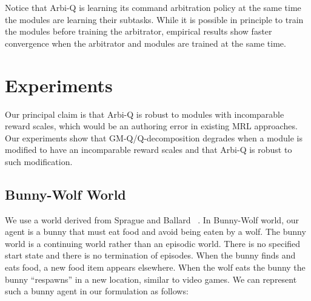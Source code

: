 Notice that Arbi-Q is learning its command arbitration policy at the same time the modules are learning their subtasks. While it is possible in principle to train the modules before training the arbitrator, empirical results show faster convergence when the arbitrator and modules are trained at the same time.

\section{Experiments}

Our principal claim is that Arbi-Q is robust to modules with incomparable reward scales, which would be an authoring error in existing MRL approaches. Our experiments show that GM-Q/Q-decomposition degrades when a module is modified to have an incomparable reward scales and that Arbi-Q is robust to such modification.

\subsection{Bunny-Wolf World}

We use a world derived from Sprague and Ballard ~\cite{sprague2003multiple-goal}.  In Bunny-Wolf world, our agent is a bunny that must eat food and avoid being eaten by a wolf.  The bunny world is a continuing world rather than an episodic world. There is no specified start state and there is no termination of episodes. When the bunny finds and eats food, a new food item appears elsewhere. When the wolf eats the bunny the bunny ``respawns'' in a new location, similar to video games. We can represent such a bunny agent in our formulation as follows:

